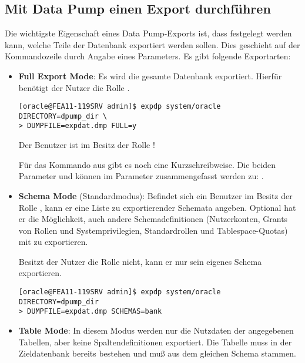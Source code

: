       \subsection{Mit Data Pump einen Export durchführen}
        Die wichtigste Eigenschaft eines Data Pump-Exports ist, dass festgelegt werden kann, welche Teile der Datenbank exportiert werden sollen. Dies geschieht auf der Kommandozeile durch Angabe eines Parameters. Es gibt folgende Exportarten:
        \begin{itemize}
          \item \textbf{Full Export Mode}: Es wird die gesamte Datenbank exportiert. Hierfür benötigt der Nutzer die Rolle .
          \begin{lstlisting}[caption={Full Database Export},label=admin901,language=expdp_impdp,emph={[9]DIRECTORY},emphstyle={[9]\sffamily\color{blue}}]
[oracle@FEA11-119SRV admin]$ expdp system/oracle DIRECTORY=dpump_dir \
> DUMPFILE=expdat.dmp FULL=y
          \end{lstlisting}
          \begin{merke}
            Der Benutzer  ist im Besitz der Rolle !
          \end{merke}
          Für das Kommando aus  gibt es noch eine Kurzschreibweise. Die beiden Parameter  und  können im Parameter  zusammengefasst werden zu: .
\clearpage
          \item \textbf{Schema Mode} (Standardmodus): Befindet sich ein Benutzer im Besitz der Rolle , kann er eine Liste zu exportierender Schemata angeben. Optional hat er die Möglichkeit, auch andere Schemadefinitionen (Nutzerkonten, Grants von Rollen und Systemprivilegien, Standardrollen und Tablespace-Quotas) mit zu exportieren.

          Besitzt der Nutzer die Rolle  nicht, kann er nur sein eigenes Schema exportieren.
          \begin{lstlisting}[caption={Schema Export},label=admin902,language=expdp_impdp,emph={[9]DIRECTORY},emphstyle={[9]\sffamily\color{blue}}]
[oracle@FEA11-119SRV admin]$ expdp system/oracle DIRECTORY=dpump_dir
> DUMPFILE=expdat.dmp SCHEMAS=bank
          \end{lstlisting}
          \item \textbf{Table Mode}: In diesem Modus werden nur die Nutzdaten der angegebenen Tabellen, aber keine Spaltendefinitionen exportiert. Die Tabelle muss in der Zieldatenbank bereits bestehen und muß aus dem gleichen Schema stammen.


\end{itemize}
